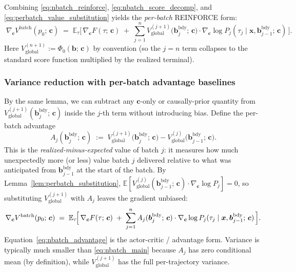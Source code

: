 \documentclass[11pt,a4paper]{article}
\newcommand{\bc}{\bm{c}}
\newcommand{\bx}{\bm{x}}
\newcommand{\bb}{\bm{b}}
\newcommand{\E}{\mathbb{E}}
\begin{document}
Combining \eqref{eq:nbatch_reinforce}, \eqref{eq:nbatch_score_decomp}, and
\eqref{eq:perbatch_value_substitution} yields the \emph{per-batch} REINFORCE form:
\begin{equation}
\boxed{\;
\nabla_{\bc} V^\mathrm{batch}(p_0;\, \bc)
\;=\;
\E_\tau\!\biggl[\,
\nabla_{\bc} F(\tau;\, \bc)
\;+\;
\sum_{j=1}^{n} V_{\mathrm{global}}^{(j+1)}\!\bigl(\bb^{\mathrm{bdy}}_j;\, \bc\bigr) \cdot \nabla_{\bc} \log P_j(\tau_j \mid \bx, \bb^{\mathrm{bdy}}_{j-1};\, \bc)
\,\biggr].
\;}
\label{eq:nbatch_main}
\end{equation}
Here $V_{\mathrm{global}}^{(n+1)} := \Phi_0(\bb;\, \bc)$ by convention (so the $j = n$ term
collapses to the standard score function multiplied by the realized terminal).

\subsubsection{Variance reduction with per-batch advantage baselines}
\label{sec:nbatch_advantage}

By the same lemma, we can subtract any $\bc$-only or causally-prior quantity from
$V_{\mathrm{global}}^{(j+1)}(\bb^{\mathrm{bdy}}_j;\, \bc)$ inside the $j$-th term without
introducing bias.  Define the per-batch advantage
\begin{equation}
A_j(\bb^{\mathrm{bdy}}_j;\, \bc) \;:=\; V_{\mathrm{global}}^{(j+1)}\!\bigl(\bb^{\mathrm{bdy}}_j;\, \bc\bigr) - V_{\mathrm{global}}^{(j)}\!\bigl(\bb^{\mathrm{bdy}}_{j-1};\, \bc\bigr).
\label{eq:advantage}
\end{equation}
This is the \emph{realized-minus-expected} value of batch $j$: it measures how much
unexpectedly more (or less) value batch $j$ delivered relative to what was anticipated
from $\bb^{\mathrm{bdy}}_{j-1}$ at the start of the batch.  By
Lemma~\ref{lem:perbatch_substitution}, $\E[V_{\mathrm{global}}^{(j)}(\bb^{\mathrm{bdy}}_{j-1};\, \bc) \cdot \nabla_{\bc} \log P_j] = 0$, so substituting $V_{\mathrm{global}}^{(j+1)}$ with $A_j$ leaves the gradient unbiased:
\begin{equation}
\nabla_{\bc} V^\mathrm{batch}(p_0;\, \bc)
\;=\;
\E_\tau\!\Bigl[\,
\nabla_{\bc} F(\tau;\, \bc)
\;+\;
\sum_{j=1}^{n} A_j(\bb^{\mathrm{bdy}}_j;\, \bc) \cdot \nabla_{\bc} \log P_j(\tau_j \mid \bx, \bb^{\mathrm{bdy}}_{j-1};\, \bc)
\,\Bigr].
\label{eq:nbatch_advantage}
\end{equation}
Equation~\eqref{eq:nbatch_advantage} is the actor-critic / advantage form.  Variance is
typically much smaller than \eqref{eq:nbatch_main} because $A_j$ has zero conditional mean
(by definition), while $V_{\mathrm{global}}^{(j+1)}$ has the full per-trajectory variance.
\end{document}
